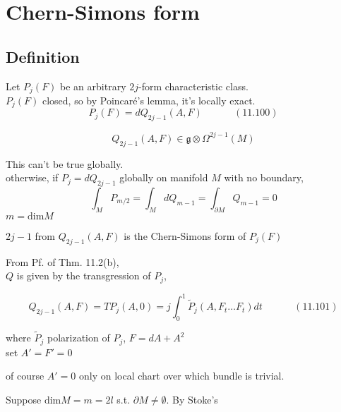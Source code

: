 \documentclass{book}
\begin{document}
\section{}



\section{}

\section{Chern-Simons form}


\subsection{ Definition }

Let $P_j(F)$ be an arbitrary $2j$-form characteristic class. \\
\phantom{Let } $P_j(F)$ closed, so by Poincar\'{e}'s lemma, it's locally exact. \\
\begin{equation}
  P_j(F) = dQ_{2j-1}(A,F) \quad \quad \quad \, (11.100)
\end{equation}

\[
Q_{2j-1}(A,F) \in \mathfrak{g} \otimes \Omega^{2j-1}(M)
\]

This can't be true globally. \\
\quad otherwise, if $P_j=dQ_{2j-1}$ globally on manifold $M$ with no boundary, 
\[
\int_M P_{m/2} = \int_M dQ_{m-1} = \int_{\partial M} Q_{m-1} = 0 
\]
$m = \text{dim}{M}$

$2j-1$  from $Q_{2j-1}(A,F)$ is the Chern-Simons form of $P_j(F)$

From Pf. of Thm. 11.2(b),  \\
\quad $Q$ is given by the transgression of $P_j$,

\begin{equation}
  Q_{2j-1}(A,F) = TP_j(A,0) = j \int_0^1 \widetilde{P}_j(A, F_t \dots F_t)dt \quad \quad \quad \, (11.101)
\end{equation}

where $\widetilde{P}_j$ polarization of $P_j$, $F= dA + A^2$ \\
\quad set $A'=F' =0$

of course $A'=0$ only on local chart over which bundle is trivial.  

Suppose $\text{dim}{M} = m = 2l$ s.t. $\partial M \neq \emptyset$.  By Stoke's 
\end{document}
